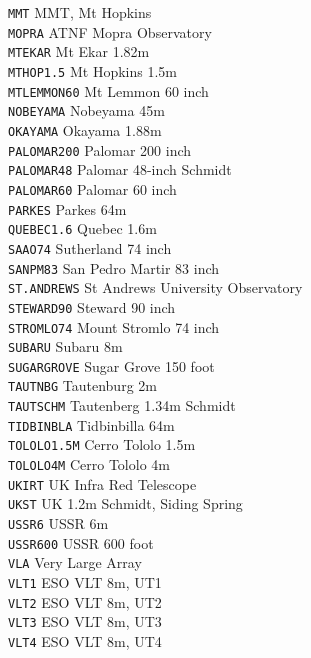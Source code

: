 \documentclass[11pt,fleqn,twoside]{article}
\renewcommand{\_}{{\tt\char'137}}     %
\begin{document}
{\begin{tabbing}
{\tt MMT} \> MMT, Mt Hopkins \\
{\tt MOPRA} \> ATNF Mopra Observatory \\
{\tt MTEKAR} \> Mt Ekar 1.82m \\
{\tt MTHOP1.5} \> Mt Hopkins 1.5m \\
{\tt MTLEMMON60} \> Mt Lemmon 60 inch \\
{\tt NOBEYAMA} \> Nobeyama 45m \\
{\tt OKAYAMA} \> Okayama 1.88m \\
{\tt PALOMAR200} \> Palomar 200 inch \\
{\tt PALOMAR48} \> Palomar 48-inch Schmidt \\
{\tt PALOMAR60} \> Palomar 60 inch \\
{\tt PARKES} \> Parkes 64m \\
{\tt QUEBEC1.6} \> Quebec 1.6m \\
{\tt SAAO74} \> Sutherland 74 inch \\
{\tt SANPM83} \> San Pedro Martir 83 inch \\
{\tt ST.ANDREWS} \> St Andrews University Observatory \\
{\tt STEWARD90} \> Steward 90 inch \\
{\tt STROMLO74} \> Mount Stromlo 74 inch \\
{\tt SUBARU} \> Subaru 8m \\
{\tt SUGARGROVE} \> Sugar Grove 150 foot \\
{\tt TAUTNBG} \> Tautenburg 2m \\
{\tt TAUTSCHM} \> Tautenberg 1.34m Schmidt \\
{\tt TIDBINBLA} \> Tidbinbilla 64m \\
{\tt TOLOLO1.5M} \> Cerro Tololo 1.5m \\
{\tt TOLOLO4M} \> Cerro Tololo 4m \\
{\tt UKIRT} \> UK Infra Red Telescope \\
{\tt UKST} \> UK 1.2m Schmidt, Siding Spring \\
{\tt USSR6} \> USSR 6m \\
{\tt USSR600} \> USSR 600 foot \\
{\tt VLA} \> Very Large Array \\
{\tt VLT1} \> ESO VLT 8m, UT1 \\
{\tt VLT2} \> ESO VLT 8m, UT2 \\
{\tt VLT3} \> ESO VLT 8m, UT3 \\
{\tt VLT4} \> ESO VLT 8m, UT4
\end{tabbing}
}
\end{document}
